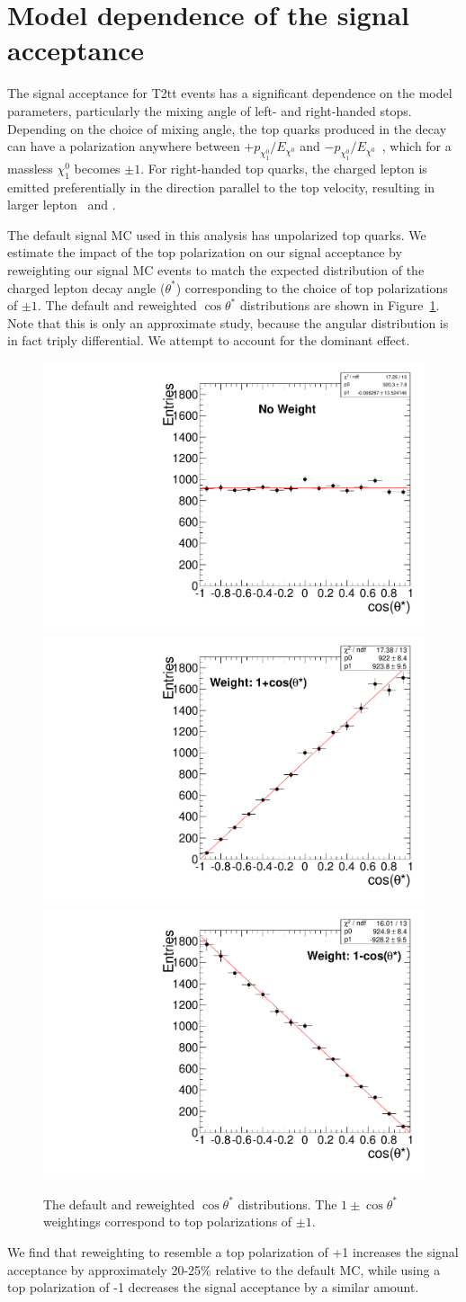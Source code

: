 \section{Model dependence of the signal acceptance}
\label{sec:modeldependence}

The signal acceptance for T2tt events has a significant dependence on the model parameters, particularly the mixing angle of left- and right-handed stops.
Depending on the choice of mixing angle, the top quarks produced in the decay can have a polarization anywhere between
$+p_{\chi_1^0}/E_{\chi^0}$ and $-p_{\chi_1^0}/E_{\chi^0}$~\cite{0811.1024}, which for a massless $\chi_1^0$ becomes $\pm 1$.
For right-handed top quarks, the charged lepton is emitted preferentially in the direction parallel to the top velocity, resulting in larger lepton \pt\ and \mt.

The default signal MC used in this analysis has unpolarized top quarks. We estimate the impact of the top polarization on our signal acceptance by reweighting
our signal MC events to match the expected distribution of the charged lepton decay angle ($\theta^{*}$) corresponding to the choice of top polarizations of $\pm 1$.
The default and reweighted $\cos\theta^{*}$ distributions are shown in Figure~\ref{fig:cosThetaStar}.
Note that this is only an approximate study, because the angular distribution is in fact triply differential. We attempt to account for the dominant effect.

\begin{figure}[hbt]
  \begin{center}
	\includegraphics[width=0.325\linewidth]{plots/costheta.pdf}
	\includegraphics[width=0.325\linewidth]{plots/costheta_1p.pdf}
	\includegraphics[width=0.325\linewidth]{plots/costheta_1m.pdf}
	\caption{
	  \label{fig:cosThetaStar}\protect 
          The default and reweighted $\cos\theta^{*}$ distributions. The $1 \pm \cos\theta^{*}$ weightings correspond to top polarizations of $\pm 1$.}
  \end{center}
\end{figure}

We find that reweighting to resemble a top polarization of +1 increases the signal acceptance by approximately 20-25\% relative to the default MC,
while using a top polarization of -1 decreases the signal acceptance by a similar amount. 